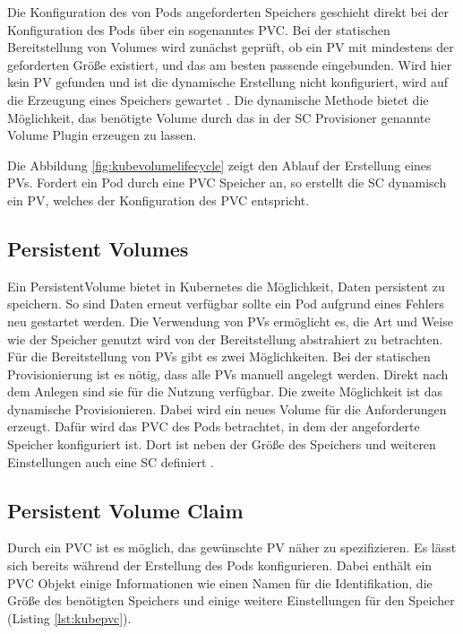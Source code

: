 Die Konfiguration des von Pods angeforderten Speichers geschieht direkt bei der Konfiguration des Pods über ein sogenanntes \ac{PVC}. Bei der statischen Bereitstellung von Volumes wird zunächst geprüft, ob ein \ac{PV} mit mindestens der geforderten Größe existiert, und das am besten passende eingebunden. Wird hier kein \ac{PV} gefunden und ist die dynamische Erstellung nicht konfiguriert, wird auf die Erzeugung eines Speichers gewartet \cite{kube:pv}. Die dynamische Methode bietet die Möglichkeit, das benötigte Volume durch das in der \ac{SC} Provisioner genannte Volume Plugin erzeugen zu lassen. \medskip

Die Abbildung \ref{fig:kubevolumelifecycle} zeigt den Ablauf der Erstellung eines \ac{PV}s. Fordert ein Pod durch eine \ac{PVC} Speicher an, so erstellt die \ac{SC} dynamisch ein \ac{PV}, welches der Konfiguration des \ac{PVC} entspricht.

\subsection{Persistent Volumes}
\label{kube:pv}
Ein PersistentVolume bietet in Kubernetes die Möglichkeit, Daten persistent zu speichern. So sind Daten erneut verfügbar sollte ein Pod aufgrund eines Fehlers neu gestartet werden. Die Verwendung von \ac{PV}s ermöglicht es, die Art und Weise wie der Speicher genutzt wird von der Bereitstellung abstrahiert zu betrachten. Für die Bereitstellung von \ac{PV}s gibt es zwei Möglichkeiten. Bei der statischen Provisionierung ist es nötig, dass alle \ac{PV}s manuell angelegt werden. Direkt nach dem Anlegen sind sie für die Nutzung verfügbar. Die zweite Möglichkeit ist das dynamische Provisionieren. Dabei wird ein neues Volume für die Anforderungen erzeugt. Dafür wird das \ac{PVC} des Pods betrachtet, in dem der angeforderte Speicher konfiguriert ist. Dort ist neben der Größe des Speichers und weiteren Einstellungen auch eine \ac{SC} definiert \cite[][]{9781788994729}. 

\subsection{Persistent Volume Claim}
\label{kube:pvc}
Durch ein \ac{PVC} ist es möglich, das gewünschte \ac{PV} näher zu spezifizieren. Es lässt sich bereits während der Erstellung des Pods konfigurieren. Dabei enthält ein \ac{PVC} Objekt einige Informationen wie einen Namen für die Identifikation, die Größe des benötigten Speichers und einige weitere Einstellungen für den Speicher (Listing \ref{lst:kubepvc}).  \medskip

